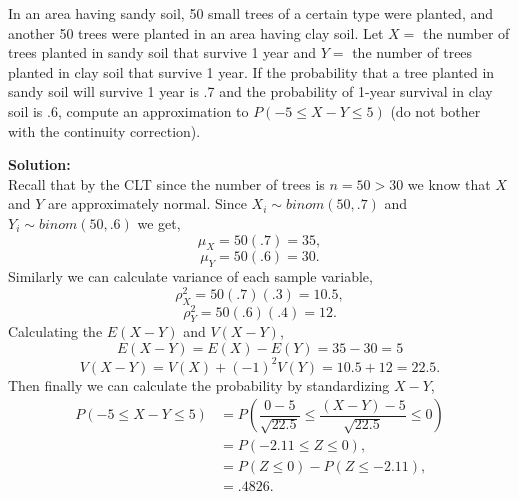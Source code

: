 \documentclass[12pt]{article}
\makeatletter
\theoremstyle{homework}
\newenvironment{exercise}[1]
{\def\@currentlabel{#1}\exercisecore}
{\endexercisecore}
\newcommand{\localhead}[1]{\par\smallskip\noindent\textbf{#1}\nobreak\\}%
\newcommand\solution{\localhead{Solution:}}
\makeatother
\begin{document}
\begin{exercise}{5.74} In  an  area  having  sandy  soil,  50  small  trees  of  a  certain  type were planted,
   and another 50 trees were planted in an area having clay soil. Let $X = $ the number of trees planted in  sandy  
   soil  that  survive  1  year  and  $Y = $  the  number  of  trees planted in clay soil that survive 1 year.
    If the probability that a tree planted in sandy soil will survive 1 year is .7 and the probability of 1-year survival 
  in clay soil is .6, compute an approximation to $P(-5 \le X-Y \le 5)$ (do not bother with the continuity correction).\\

  \solution Recall that by the CLT since the number of trees is $n = 50 > 30$ we know that $X$ and $Y$ are approximately normal.
  Since $X_i \sim binom(50, .7)$ and $Y_i \sim binom(50, .6)$ we get,
  \begin{equation*}
    \mu_{X} = 50(.7) = 35,
  \end{equation*}  
  \begin{equation*}
    \mu_{Y} = 50(.6) = 30.
  \end{equation*}  
Similarly we can calculate variance of each sample variable,
\begin{equation*}
  \rho_{X}^2 = 50(.7)(.3) = 10.5,
\end{equation*}  
\begin{equation*}
  \rho_{Y}^2 = 50(.6)(.4) = 12.
\end{equation*} 
Calculating the $E(X - Y)$ and $V(X - Y)$,
\begin{equation*}
  E(X - Y) = E(X) - E(Y) = 35 - 30 = 5
\end{equation*}
\begin{equation*}
  V(X - Y) = V(X)+ (-1)^2V(Y) = 10.5 + 12 = 22.5.
\end{equation*}
Then finally we can calculate the probability by standardizing $X - Y$,
\begin{align*}
  P(-5 \le X-Y \le 5) &= P(\dfrac{0 - 5}{\sqrt{22.5}} \le \dfrac{(X-Y) - 5}{\sqrt{22.5}} \le 0)\\
  &= P(-2.11 \le Z \le 0),\\
  & = P(Z \le 0) - P(Z \le -2.11),\\
  &=.4826.
\end{align*}

\end{exercise}
\vspace{.5in}
\end{document}

